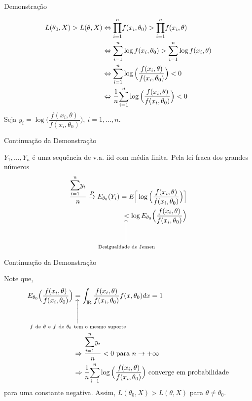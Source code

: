 \documentclass[12pt]{beamer}
\begin{document}
\begin{frame}{Demonstração}
\begin{block}{}
\justifying
\begin{align*}
L(\theta_{0},X)>L(\theta,X)&\Leftrightarrow {\displaystyle {\displaystyle \prod_{i=1}^{n}}f(x_{i},\theta_{0})>{\displaystyle \prod_{i=1}^{n}}f(x_{i},\theta)}\\
&\Leftrightarrow{\displaystyle \sum_{i=1}^{n}}\log{f(x_{i},\theta_{0})}>{\displaystyle \sum_{i=1}^{n}}\log{f(x_{i},\theta)}\\
&\Leftrightarrow{\displaystyle \sum_{i=1}^{n}}\log{\Big(\dfrac{f(x_{i},\theta)}{f(x_{i},\theta_{0})}\Big)}<0\\
&\Leftrightarrow\dfrac{1}{n}{\displaystyle \sum_{i=1}^{n}}\log{\Big(\dfrac{f(x_{i},\theta)}{f(x_{i},\theta_{0})}\Big)}<0
\end{align*}
Seja $y_{i}=\log{\Big(\dfrac{f(x_{i},\theta)}{f(x_{i},\theta_{0})}\Big)},~i=1,\ldots,n.$
\end{block}
\end{frame}

\begin{frame}{Continuação da Demonstração}
\begin{block}{}
\justifying
$Y_{1},\ldots,Y_{n}$ é uma sequência de v.a. iid com média finita. Pela lei fraca dos grandes números
\begin{align*}
    \dfrac{\Sumi y_{i}}{n}\ConvP E_{\theta_{0}}(Y_{i})=E\Big[\log{\Big(\dfrac{f(x_{i},\theta)}{f(x_{i},\theta_{0})}\Big)}\Big]\\
    \SetaUP{\text{Desigualdade de Jensen}}{<}\log{E_{\theta_{0}}\Big(\dfrac{f(x_{i},\theta)}{f(x_{i},\theta_{0})}\Big)}
\end{align*}
\end{block}
\end{frame}

\begin{frame}{Continuação da Demonstração}
\begin{block}{}
\justifying
Note que,
\begin{align*}
E_{\theta_{0}}\Big(\dfrac{f(x_{i},\theta)}{f(x_{i},\theta_{0})}\Big)&\SetaUP{f~\text{de}~\theta~\text{e}~f~\text{de}~\theta_{0}~\text{tem o mesmo suporte}}{=}\int_{\R} \dfrac{f(x_{i},\theta)}{f(x_{i},\theta_{0})}f(x,\theta_{0})dx=1\\
&\Rightarrow \dfrac{\Sumi y_{i}}{n}<0~\text{para}~n\rightarrow +\infty\\
&\Rightarrow \dfrac{1}{n}\Sumi\log{\Big(\dfrac{f(x_{i},\theta)}{f(x_{i},\theta_{0})}\Big)}~\text{converge em probabilidade}
\end{align*}
para uma constante negativa. Assim, $L(\theta_{0},X)>L(\theta,X)$ para $\theta\neq\theta_{0}.$
\end{block}
\end{frame}
\end{document}
